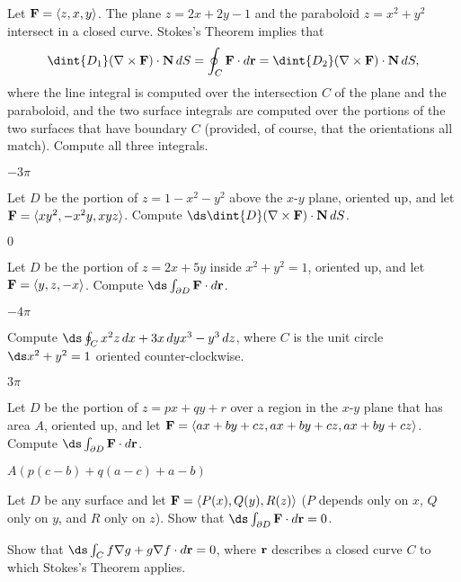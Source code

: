 \begin{exercises}

\exercise
Let ${\bf F}=\langle z,x,y\rangle$.
The plane $z=2x+2y-1$ and the paraboloid $z=x^2+y^2$ intersect in a
closed curve. Stokes's Theorem implies that
$$\dint{D_1} (\nabla\times{\bf F})\cdot {\bf N}\,dS=
\oint_C {\bf F}\cdot d{\bf r}=
\dint{D_2} (\nabla\times{\bf F})\cdot {\bf N}\,dS,
$$
where the line integral is computed over the intersection $C$ of the plane
and the paraboloid, and the two surface integrals are computed over
the portions of the two surfaces that have boundary $C$ (provided, of
course, that the orientations all match). Compute all three integrals.
\begin{answer} $-3\pi$
\end{answer}

\exercise Let $D$ be the portion of $z=1-x^2-y^2$ above the $x$-$y$
plane, oriented up, and let ${\bf F}=\langle
xy^2,-x^2y,xyz\rangle$. Compute $\ds\dint{D} (\nabla\times{\bf
F})\cdot {\bf N}\,dS$.
\begin{answer} $0$
\end{answer}

\exercise Let $D$ be the portion of $z=2x+5y$ inside $x^2+y^2=1$,
oriented up, and
let ${\bf F}=\langle y,z,-x\rangle$. Compute
$\ds\int_{\partial D} {\bf F}\cdot d{\bf r}$.
\begin{answer} $-4\pi$
\end{answer}

\exercise Compute $\ds\oint_C x^2z\,dx + 3x\,dy x^3 - y^3\,dz$, where $C$
is the unit circle $\ds x^2+y^2=1$ oriented counter-clockwise.
\begin{answer} $3\pi$
\end{answer}

\exercise Let $D$ be the portion of $z=px+qy+r$ over a region in the
$x$-$y$ plane that has area $A$, oriented up, and 
let ${\bf F}=\langle ax+by+cz,ax+by+cz,ax+by+cz\rangle$. Compute
$\ds\int_{\partial D} {\bf F}\cdot d{\bf r}$.
\begin{answer} $A(p(c-b)+q(a-c)+a-b)$
\end{answer}

\exercise Let $D$ be any surface and 
let ${\bf F}=\langle P(x),Q(y),R(z)\rangle$ ($P$ depends only on $x$,
$Q$ only on $y$, and $R$ only on $z$). Show that
$\ds\int_{\partial D} {\bf F}\cdot d{\bf r}=0$.

\exercise Show that $\ds\int_C f\nabla g+g\nabla f\cdot d{\bf r}=0$, where
$\bf r$ describes a closed curve $C$ to which Stokes's Theorem
applies.

\end{exercises}


